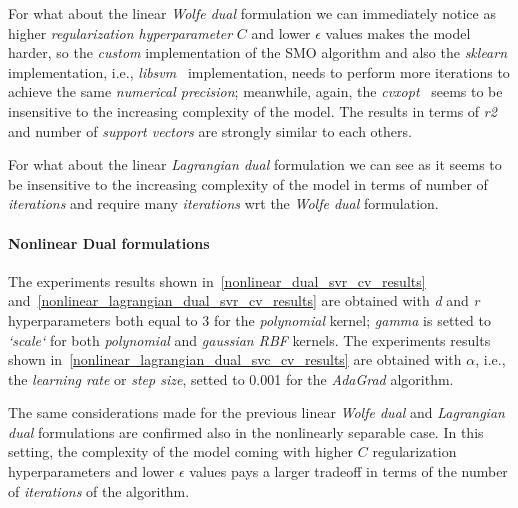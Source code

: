 

For what about the linear \emph{Wolfe dual} formulation we can immediately notice as higher \emph{regularization hyperparameter} $C$ and lower $\epsilon$ values makes the model harder, so the \emph{custom} implementation of the SMO algorithm and also the \emph{sklearn} implementation, i.e., \emph{libsvm}~\cite{chang2011libsvm} implementation, needs to perform more iterations to achieve the same \emph{numerical precision}; meanwhile, again, the \emph{cvxopt}~\cite{vandenberghe2010cvxopt} seems to be insensitive to the increasing complexity of the model. The results in terms of \emph{r2} and number of \emph{support vectors} are strongly similar to each others.



For what about the linear \emph{Lagrangian dual} formulation we can see as it seems to be insensitive to the increasing complexity of the model in terms of number of \emph{iterations} and require many \emph{iterations} wrt the \emph{Wolfe dual} formulation.

\paragraph{Nonlinear Dual formulations}

The experiments results shown in~\ref{nonlinear_dual_svr_cv_results} and~\ref{nonlinear_lagrangian_dual_svr_cv_results} are obtained with \emph{d} and \emph{r} hyperparameters both equal to 3 for the \emph{polynomial} kernel; \emph{gamma} is setted to \emph{`scale`} for both \emph{polynomial} and \emph{gaussian RBF} kernels. The experiments results shown in~\ref{nonlinear_lagrangian_dual_svc_cv_results} are obtained with $\alpha$, i.e., the \emph{learning rate} or \emph{step size}, setted to 0.001 for the \emph{AdaGrad} algorithm.





The same considerations made for the previous linear \emph{Wolfe dual} and \emph{Lagrangian dual} formulations are confirmed also in the nonlinearly separable case. In this setting, the complexity of the model coming with higher $C$ regularization hyperparameters and lower $\epsilon$ values pays a larger tradeoff in terms of the number of \emph{iterations} of the algorithm.

\pagebreak

